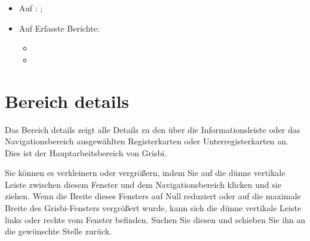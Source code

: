\begin{itemize}
\begin{itemize}
			 \item {}%
			 \item {}%
		\end{itemize}
	 \item Auf : ;%
	 \item Auf Erfasste Berichte:%
		\begin{itemize}
			 \item {}%
			 \item {}%
		\end{itemize}
\end{itemize}

\section{Bereich details\label{home-details}}

Das Bereich details zeigt alle Details zu den über die Informationsleiste oder das Navigationsbereich ausgewählten Registerkarten oder Unterregisterkarten an. Dies ist der Hauptarbeitsbereich von Grisbi.

Sie können es verkleinern oder vergrößern, indem Sie auf die dünne vertikale Leiste zwischen diesem Fenster und dem Navigationsbereich klicken und sie ziehen. Wenn die Breite dieses Fensters auf Null reduziert oder auf die maximale Breite des Grisbi-Fensters vergrößert wurde, kann sich die dünne vertikale Leiste links oder rechts vom Fenster befinden. Suchen Sie diesen und schieben Sie ihn an die gewünschte Stelle zurück.%

